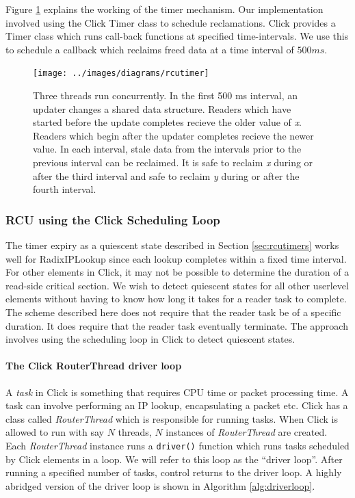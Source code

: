 \documentclass[a4paper,marginparwidth=50pt,marginparsep=10pt]{article}
\begin{document}
Figure \ref{fig:rcutimer} explains the working of the timer mechanism. Our implementation involved using the Click Timer class to schedule reclamations. Click provides a Timer class which runs call-back functions at specified time-intervals. We use this to schedule a callback which reclaims freed data at a time interval of $500 ms$.
\begin{figure}[float=tph]
\begin{center}
\texttt{[image: ../images/diagrams/rcutimer]}
\caption{ Three threads run concurrently. In the first 500 ms interval, an updater changes a shared data structure. Readers which have started before the update completes recieve the older value of \emph{x}. Readers which begin after the updater completes recieve the newer value. In each interval, stale data from the intervals prior to the previous interval can be reclaimed. It is safe to reclaim \emph{x} during or after the third interval and safe to reclaim \emph{y} during or after the fourth interval.
}
\label{fig:rcutimer}
\end{center}
\end{figure}

\subsubsection{RCU using the Click Scheduling Loop}
\label{rcuschedloop}

The timer expiry as a quiescent state described in Section \ref{sec:rcutimers} works well for RadixIPLookup since each lookup completes within a fixed time interval. For other elements in Click, it may not be possible to determine the duration of a read-side critical section. We wish to detect quiescent states for all other userlevel elements without having to know how long it takes for a reader task to complete. The scheme described here does not require that the reader task be of a specific duration. It does require that the reader task eventually terminate. The approach involves using the scheduling loop in Click to detect quiescent states. 

\paragraph{The Click RouterThread driver loop}
A \emph{task} in Click is something that requires CPU time or packet processing time. A task can involve performing an IP lookup, encapsulating a packet etc. Click has a class called \emph{RouterThread} which is responsible for running tasks. When Click is allowed to run with say $N$ threads, $N$ instances of \emph{RouterThread} are created. Each \emph{RouterThread} instance runs a \verb+driver()+ function which runs tasks scheduled by Click elements in a loop. We will refer to this loop as the ``driver loop''. After running a specified number of tasks, control returns to the driver loop. A highly abridged version of the driver loop is shown in Algorithm \ref{alg:driverloop}.
\end{document}
